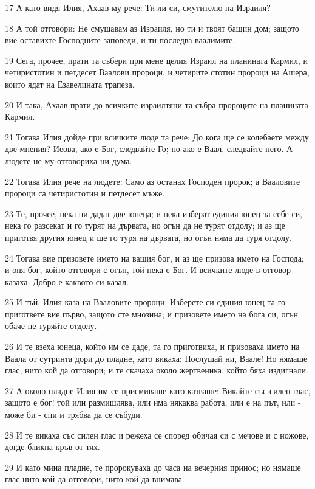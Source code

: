 \par 17 А като видя Илия, Ахаав му рече: Ти ли си, смутителю на Израиля?
\par 18 А той отговори: Не смущавам аз Израиля, но ти и твоят бащин дом; защото вие оставихте Господните заповеди, и ти последва ваалимите.
\par 19 Сега, прочее, прати та събери при мене целия Израил на планината Кармил, и четиристотин и петдесет Ваалови пророци, и четирите стотин пророци на Ашера, които ядат на Езавелината трапеза.
\par 20 И така, Ахаав прати до всичките израилтяни та събра пророците на планината Кармил.
\par 21 Тогава Илия дойде при всичките люде та рече: До кога ще се колебаете между две мнения? Иеова, ако е Бог, следвайте Го; но ако е Ваал, следвайте него. А людете не му отговориха ни дума.
\par 22 Тогава Илия рече на людете: Само аз останах Господен пророк; а Вааловите пророци са четиристотин и петдесет мъже.
\par 23 Те, прочее, нека ни дадат две юнеца; и нека изберат единия юнец за себе си, нека го разсекат и го турят на дървата, но огън да не турят отдолу; и аз ще приготвя другия юнец и ще го туря на дървата, но огън няма да туря отдолу.
\par 24 Тогава вие призовете името на вашия бог, и аз ще призова името на Господа; и оня бог, който отговори с огън, той нека е Бог. И всичките люде в отговор казаха: Добро е каквото си казал.
\par 25 И тъй, Илия каза на Вааловите пророци: Изберете си единия юнец та го пригответе вие първо, защото сте мнозина; и призовете името на бога си, огън обаче не туряйте отдолу.
\par 26 И те взеха юнеца, който им се даде, та го приготвиха, и призоваха името на Ваала от сутринта дори до пладне, като викаха: Послушай ни, Ваале! Но нямаше глас, нито кой да отговори; и те скачаха около жертвеника, който бяха издигнали.
\par 27 А около пладне Илия им се присмиваше като казваше: Викайте със силен глас, защото е бог! той или размишлява, или има някаква работа, или е на път, или - може би - спи и трябва да се събуди.
\par 28 И те викаха със силен глас и режеха се според обичая си с мечове и с ножове, догде бликна кръв от тях.
\par 29 И като мина пладне, те пророкуваха до часа на вечерния принос; но нямаше глас нито кой да отговори, нито кой да внимава.
